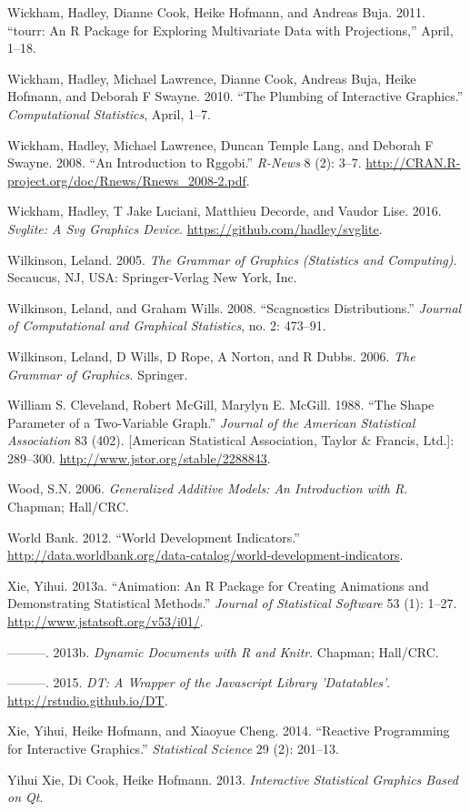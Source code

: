 \documentclass[12pt,]{isuthesis}
\begin{document}
\hypertarget{ref-tourr}{}
Wickham, Hadley, Dianne Cook, Heike Hofmann, and Andreas Buja. 2011.
``tourr: An R Package for Exploring Multivariate Data with
Projections,'' April, 1--18.

\hypertarget{ref-plumbing}{}
Wickham, Hadley, Michael Lawrence, Dianne Cook, Andreas Buja, Heike
Hofmann, and Deborah F Swayne. 2010. ``The Plumbing of Interactive
Graphics.'' \emph{Computational Statistics}, April, 1--7.

\hypertarget{ref-rggobi}{}
Wickham, Hadley, Michael Lawrence, Duncan Temple Lang, and Deborah F
Swayne. 2008. ``An Introduction to Rggobi.'' \emph{R-News} 8 (2): 3--7.
\url{http://CRAN.R-project.org/doc/Rnews/Rnews_2008-2.pdf}.

\hypertarget{ref-svglite}{}
Wickham, Hadley, T Jake Luciani, Matthieu Decorde, and Vaudor Lise.
2016. \emph{Svglite: A Svg Graphics Device}.
\url{https://github.com/hadley/svglite}.

\hypertarget{ref-Wilkinson:2005}{}
Wilkinson, Leland. 2005. \emph{The Grammar of Graphics (Statistics and
Computing)}. Secaucus, NJ, USA: Springer-Verlag New York, Inc.

\hypertarget{ref-Wilkinson:2008}{}
Wilkinson, Leland, and Graham Wills. 2008. ``Scagnostics
Distributions.'' \emph{Journal of Computational and Graphical
Statistics}, no. 2: 473--91.

\hypertarget{ref-wilkinson}{}
Wilkinson, Leland, D Wills, D Rope, A Norton, and R Dubbs. 2006.
\emph{The Grammar of Graphics}. Springer.

\hypertarget{ref-banking}{}
William S. Cleveland, Robert McGill, Marylyn E. McGill. 1988. ``The
Shape Parameter of a Two-Variable Graph.'' \emph{Journal of the American
Statistical Association} 83 (402). {[}American Statistical Association,
Taylor \& Francis, Ltd.{]}: 289--300.
\url{http://www.jstor.org/stable/2288843}.

\hypertarget{ref-mgcv}{}
Wood, S.N. 2006. \emph{Generalized Additive Models: An Introduction with
R}. Chapman; Hall/CRC.

\hypertarget{ref-WorldBank}{}
World Bank. 2012. ``World Development Indicators.''
\url{http://data.worldbank.org/data-catalog/world-development-indicators}.

\hypertarget{ref-animation}{}
Xie, Yihui. 2013a. ``Animation: An R Package for Creating Animations and
Demonstrating Statistical Methods.'' \emph{Journal of Statistical
Software} 53 (1): 1--27. \url{http://www.jstatsoft.org/v53/i01/}.

\hypertarget{ref-knitr}{}
---------. 2013b. \emph{Dynamic Documents with R and Knitr}. Chapman;
Hall/CRC.

\hypertarget{ref-DT}{}
---------. 2015. \emph{DT: A Wrapper of the Javascript Library
'Datatables'}. \url{http://rstudio.github.io/DT}.

\hypertarget{ref-Xie:2014co}{}
Xie, Yihui, Heike Hofmann, and Xiaoyue Cheng. 2014. ``Reactive
Programming for Interactive Graphics.'' \emph{Statistical Science} 29
(2): 201--13.

\hypertarget{ref-cranvas}{}
Yihui Xie, Di Cook, Heike Hofmann. 2013. \emph{Interactive Statistical
Graphics Based on Qt}.



\end{document}
